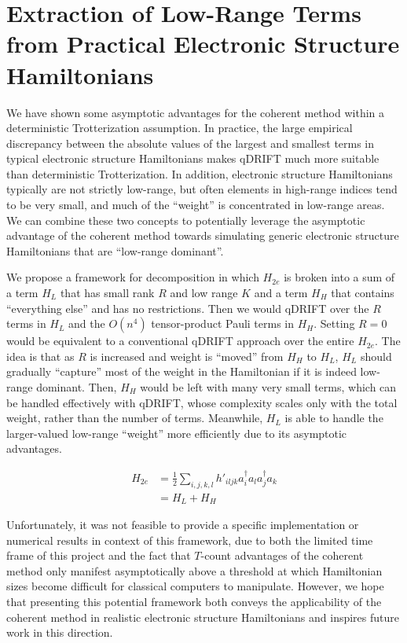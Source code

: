 \section{Extraction of Low-Range Terms from Practical Electronic Structure Hamiltonians}

We have shown some asymptotic advantages for the coherent method within a deterministic Trotterization assumption. In practice, the large empirical discrepancy between the absolute values of the largest and smallest terms in typical electronic structure Hamiltonians makes qDRIFT much more suitable than deterministic Trotterization. In addition, electronic structure Hamiltonians typically are not strictly low-range, but often elements in high-range indices tend to be very small, and much of the ``weight'' is concentrated in low-range areas. We can combine these two concepts to potentially leverage the asymptotic advantage of the coherent method towards simulating generic electronic structure Hamiltonians that are ``low-range dominant''.

We propose a framework for decomposition in which $H_{2e}$ is broken into a sum of a term $H_L$ that has small rank $R$ and low range $K$ and a term $H_H$ that contains ``everything else'' and has no restrictions. Then we would qDRIFT over the $R$ terms in $H_L$ and the $O(n^4)$ tensor-product Pauli terms in $H_H$. Setting $R = 0$ would be equivalent to a conventional qDRIFT approach over the entire $H_{2e}$. The idea is that as $R$ is increased and weight is ``moved'' from $H_H$ to $H_L$, $H_L$ should gradually ``capture'' most of the weight in the Hamiltonian if it is indeed low-range dominant. Then, $H_H$ would be left with many very small terms, which can be handled effectively with qDRIFT, whose complexity scales only with the total weight, rather than the number of terms. Meanwhile, $H_L$ is able to handle the larger-valued low-range ``weight'' more efficiently due to its asymptotic advantages.

\begin{equation}
    \begin{split}
        H_{2e} &= \frac{1}{2}\sum_{i,j,k,l} h'_{iljk}a^\dag_ia_la^\dag_ja_k \\
        &= H_L + H_H
    \end{split}
\end{equation}

Unfortunately, it was not feasible to provide a specific implementation or numerical results in context of this framework, due to both the limited time frame of this project and the fact that $T$-count advantages of the coherent method only manifest asymptotically above a threshold at which Hamiltonian sizes become difficult for classical computers to manipulate. However, we hope that presenting this potential framework both conveys the applicability of the coherent method in realistic electronic structure Hamiltonians and inspires future work in this direction.



